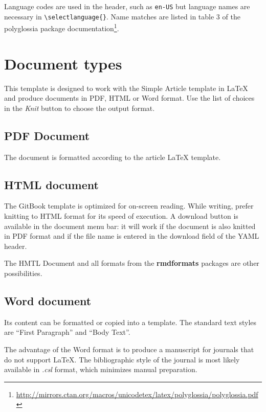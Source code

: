 \documentclass[fleqn,]{article} %
\begin{document}
Language codes are used in the header, such as \texttt{en-US} but language names are necessary in \texttt{\textbackslash{}selectlanguage\{\}}.
Name matches are listed in table 3 of the polyglossia package documentation\footnote{\url{http://mirrors.ctan.org/macros/unicodetex/latex/polyglossia/polyglossia.pdf}}.

\hypertarget{document-types}{%
\section{Document types}\label{document-types}}

This template is designed to work with the Simple Article template in LaTeX and produce documents in PDF, HTML or Word format.
Use the list of choices in the \emph{Knit} button to choose the output format.

\hypertarget{pdf-document}{%
\subsection{PDF Document}\label{pdf-document}}

The document is formatted according to the article LaTeX template.

\hypertarget{html-document}{%
\subsection{HTML document}\label{html-document}}

The GitBook template is optimized for on-screen reading.
While writing, prefer knitting to HTML format for its speed of execution.
A download button is available in the document menu bar: it will work if the document is also knitted in PDF format and if the file name is entered in the download field of the YAML header.

The HMTL Document and all formats from the \textbf{rmdformats} packages are other possibilities.

\hypertarget{word-document}{%
\subsection{Word document}\label{word-document}}

Its content can be formatted or copied into a template.
The standard text styles are \enquote{First Paragraph} and \enquote{Body Text}.

The advantage of the Word format is to produce a manuscript for journals that do not support LaTeX.
The bibliographic style of the journal is most likely available in \emph{.csl} format, which minimizes manual preparation.
\end{document}
